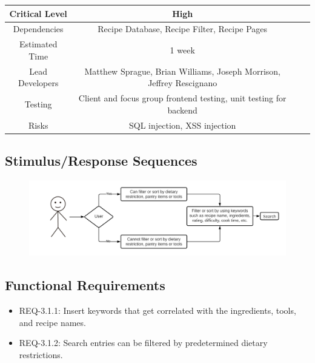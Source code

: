 \documentclass{scrreprt}
\begin{document}
\begin{center}
    \begin{tabular}{| c | c | c | c |}
        \hline
        Critical Level  & High                                                                 \\
        \hline
        Dependencies    & Recipe Database, Recipe Filter, Recipe Pages                         \\
        \hline
        Estimated Time  & 1 week                                                               \\
        \hline
        Lead Developers & Matthew Sprague, Brian Williams, Joseph Morrison, Jeffrey Rescignano \\
        \hline
        Testing         & Client and focus group \gls{frontend} testing,
                          \gls{unit testing} for \gls{backend}                                 \\
        \hline
        Risks           & \gls{SQL injection}, \gls{XSS injection}                             \\
        \hline
    \end{tabular}
\end{center}

\subsection{Stimulus/Response Sequences}

\begin{figure}[H]\centering
    \includegraphics[width=\columnwidth]{FlowCharts/Search-Search.png}
\end{figure}

\subsection{\gls{Functional Requirements}}

\begin{itemize}
    \item REQ-3.1.1: Insert keywords that get correlated with the ingredients, tools, and recipe names.
    \item REQ-3.1.2: Search entries can be filtered by predetermined dietary restrictions.
\end{itemize}
\end{document}
